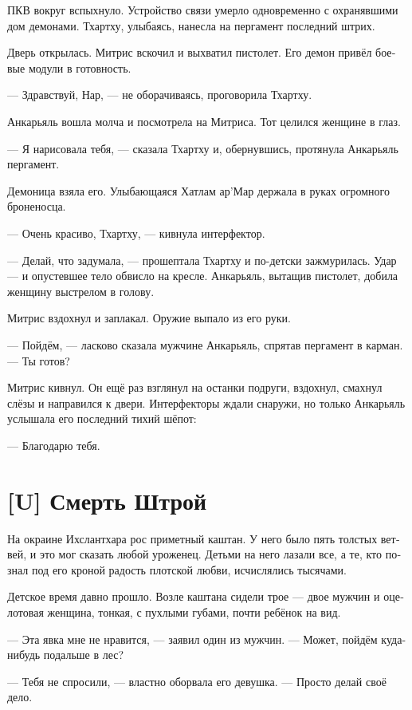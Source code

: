 \documentclass[a4paper,12pt,fleqn]{book}\usepackage{cooltooltips}\usepackage{polyglossia}\setdefaultlanguage[babelshorthands=true]{russian}\setotherlanguage{english}\defaultfontfeatures{Ligatures=TeX,Mapping=tex-text} \usepackage{xcolor}\definecolor{lightgray}{HTML}{bbbbbb}\color{lightgray}\newcommand{\ml}[3]{\textenglish{\textcolor{black}{#3}}}
\newcommand{\textspace}{\vspace{1em}{\centering\Large\bfseries<...>\par}\vspace{1em}}
\begin{document}
ПКВ вокруг вспыхнуло.
Устройство связи умерло одновременно с охранявшими дом демонами.
Тхартху, улыбаясь, нанесла на пергамент последний штрих.

Дверь открылась.
Митрис вскочил и выхватил пистолет.
Его демон привёл боевые модули в готовность.

--- Здравствуй, Нар, --- не оборачиваясь, проговорила Тхартху.

Анкарьяль вошла молча и посмотрела на Митриса.
Тот целился женщине в глаз.

--- Я нарисовала тебя, --- сказала Тхартху и, обернувшись, протянула Анкарьяль пергамент.

Демоница взяла его.
Улыбающаяся Хатлам ар’Мар держала в руках огромного броненосца.

--- Очень красиво, Тхартху, --- кивнула интерфектор.

--- Делай, что задумала, --- прошептала Тхартху и по-детски зажмурилась.
Удар --- и опустевшее тело обвисло на кресле.
Анкарьяль, вытащив пистолет, добила женщину выстрелом в голову.

Митрис вздохнул и заплакал.
Оружие выпало из его руки.

--- Пойдём, --- ласково сказала мужчине Анкарьяль, спрятав пергамент в карман.
--- Ты готов?

Митрис кивнул.
Он ещё раз взглянул на останки подруги, вздохнул, смахнул слёзы и направился к двери.
Интерфекторы ждали снаружи, но только Анкарьяль услышала его последний тихий шёпот:

--- Благодарю тебя.

\section{[U] Смерть Штрой}

\textspace

На окраине Ихслантхара рос приметный каштан.
У него было пять толстых ветвей, и это мог сказать любой уроженец.
Детьми на него лазали все, а те, кто познал под его кроной радость плотской любви, исчислялись тысячами.

Детское время давно прошло.
Возле каштана сидели трое --- двое мужчин и оцелотовая женщина, тонкая, с пухлыми губами, почти ребёнок на вид.

--- Эта явка мне не нравится, --- заявил один из мужчин.
--- Может, пойдём куда-нибудь подальше в лес?

--- Тебя не спросили, --- властно оборвала его девушка.
--- Просто делай своё дело.
\end{document}
